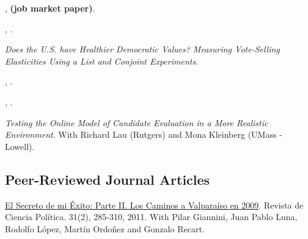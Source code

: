 \documentclass[letterpaper]{article}
\renewenvironment{itemize}{
  \begin{list}{}{
    \setlength{\leftmargin}{1.5em}
  }
}{
  \end{list}
}
\begin{document}
\begin{itemize}
  
  \item[$\bullet$] \href{http://github.com/hbahamonde/IncomeTaxAdoption/raw/master/Bahamonde_IncomeTaxAdoption.pdf}{\unskip}, {\bf \emph{\unskip} (job market paper)}.
  
  \item[$\bullet$] \href{http://github.com/hbahamonde/Clientelism_paper/raw/master/Bahamonde_Clientelism_Paper.pdf}{\unskip}, {\bf \emph{\unskip}}.
  
  \item[$\bullet$] \emph{Does the U.S. have Healthier Democratic Values? Measuring Vote-Selling Elasticities Using a List and Conjoint Experiments}.
  
  \item[$\bullet$] \href{https://github.com/hbahamonde/Negative_Link_Paper/raw/master/Bahamonde_NegativeLink.pdf}{\unskip}, {\bf \emph{\unskip}}.
  
  \item[$\bullet$]  \href{https://github.com/hbahamonde/Earthquake_Paper/raw/master/Bahamonde_Earthquake_Paper.pdf}{\unskip}, {\bf \emph{\unskip}}.
  
  
  \item[$\bullet$] \emph{Testing the Online Model of Candidate Evaluation in a More Realistic Environment}. With Richard Lau (Rutgers) and Mona Kleinberg (UMass - Lowell).
\end{itemize}


\subsection*{Peer-Reviewed Journal Articles}

\begin{itemize}
  \item[$\bullet$] \href{http://www.revistacienciapolitica.cl/rcp/wp-content/uploads/2013/09/07_vol_31_2.pdf}{El Secreto de mi \'Exito: Parte II. Los Caminos a Valpara\'iso en 2009}. Revista de Ciencia Pol\'itica. 31(2), 285-310, 2011. With Pilar Giannini, Juan Pablo Luna, Rodolfo L\'opez, Mart\'in Ordo\~nez and Gonzalo Recart.
\end{itemize}
\end{document}
